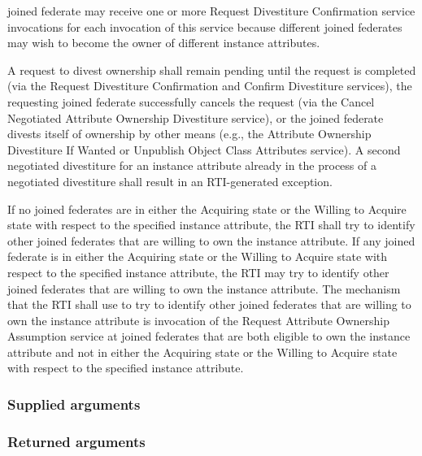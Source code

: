 \begin{compactstdpage}

    joined federate may receive one or more Request Divestiture Confirmation \rtiinitiated{} service invocations for each invocation of this service because different joined federates may wish to become the owner of different instance attributes.


    A request to divest ownership shall remain pending until the request is completed (via the Request Divestiture Confirmation \rtiinitiated{} and Confirm Divestiture services), the requesting joined federate successfully cancels the request (via the Cancel Negotiated Attribute Ownership Divestiture service), or the joined federate divests itself of ownership by other means (e.g., the Attribute Ownership Divestiture If Wanted or Unpublish Object Class Attributes service). A second negotiated divestiture for an instance attribute already in the process of a negotiated divestiture shall result in an RTI-generated exception.


    If no joined federates are in either the Acquiring state or the Willing to Acquire state with respect to the specified instance attribute, the RTI shall try to identify other joined federates that are willing to own the instance attribute. If any joined federate is in either the Acquiring state or the Willing to Acquire state with respect to the specified instance attribute, the RTI may try to identify other joined federates that are willing to own the instance attribute. The mechanism that the RTI shall use to try to identify other joined federates that are willing to own the instance attribute is invocation of the Request Attribute Ownership Assumption \rtiinitiated{} service at joined federates that are both eligible to own the instance attribute and not in either the Acquiring state or the Willing to Acquire state with respect to the specified instance attribute.

    \subsubsection{Supplied arguments}



    \subsubsection{Returned arguments}



\end{compactstdpage}
